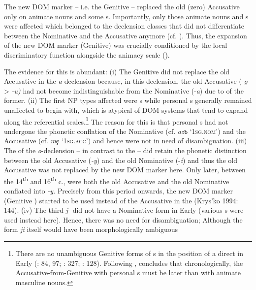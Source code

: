 \documentclass[output=paper]{langsci/langscibook}
\begin{document}
The new DOM marker – i.e. the Genitive  – replaced the old (zero) Accusative only on animate nouns and some s. Importantly, only those animate nouns and s were affected which belonged to the declension classes that did not differentiate between the Nominative and the Accusative anymore (cf. ). Thus, the expansion of the new DOM marker (Genitive) was crucially conditioned by the local discriminatory function alongside the animacy scale (\citealt{Krysko1994_Russ}). 

The evidence for this is abundant: (i) The Genitive did not replace the old Accusative in the \textit{a-}declension because, in this declension, the old Accusative (\nobreakdash-\textit{ǫ} > \textit{-u)} had not become indistinguishable from the Nominative (-\textit{a}) due to  of the former. (ii) The first NP types affected were s while personal s generally remained unaffected to begin with, which is atypical of DOM systems that tend to expand along the referential scales.\footnote{There are no unambiguous Genitive forms of s in the position of a direct  in Early  (\citealt{Meillet1897}: 84, 97; \citealt{Vondrák1898}: 327; \citealt{Krysko1994_Russ}: 128). Following , \citet[251]{Kurylowicz1962_Slavic} concludes that chronologically, the Accusative-from-Genitive with personal s must be later than with animate masculine nouns.} The reason for this is that personal s had not undergone the phonetic conflation of the Nominative (cf. \textit{az{ъ}} ‘1\textsc{sg.nom}’) and the Accusative (cf. \textit{mȩ} ‘1\textsc{sg.acc}’) and hence were not in need of disambiguation. (iii) The  of the \textit{o}{}-declension – in contrast to the  – did retain the phonetic distinction between the old Accusative (\textit{{}-y}) and the old Nominative (-\textit{i}) and thus the old Accusative was not replaced by the new DOM marker here. Only later, between the 14\textsuperscript{th} and 16\textsuperscript{th} c., were both the old Accusative  and the old Nominative  conflated into \textit{{}-y}. Precisely from this period onwards, the new DOM marker (Genitive ) started to be used instead of the Accusative in the  (Krys’ko 1994: 144). (iv) The third   \textit{j-} did not have a Nominative form in Early  (various s were used instead here). Hence, there was no need for disambiguation; Although the form \textit{ji} itself would have been morphologically ambiguous 
\end{document}
